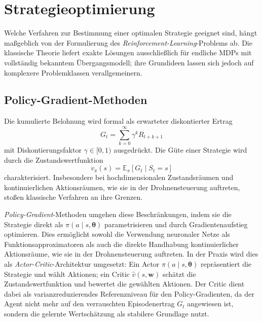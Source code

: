 \section{Strategieoptimierung}
\label{sec:ppo}

Welche Verfahren zur Bestimmung einer optimalen Strategie geeignet sind, hängt maßgeblich von der Formulierung des \textit{Reinforcement-Learning}-Problems ab. Die klassische Theorie liefert exakte Lösungen ausschließlich für endliche MDPs mit vollständig bekanntem Übergangsmodell; ihre Grundideen lassen sich jedoch auf komplexere Problemklassen verallgemeinern.

\subsection{Policy-Gradient-Methoden}
\label{subsec:policy_gradient}

Die kumulierte Belohnung wird formal als erwarteter
diskontierter Ertrag
\begin{equation} \label{eq:return}
    G_t = \sum_{k=0}^{\infty} \gamma^k R_{t+k+1}
\end{equation}
mit Diskontierungsfaktor $\gamma \in [0,1)$ ausgedrückt. Die
Güte einer Strategie wird durch die
Zustandswertfunktion
\begin{equation} \label{eq:state_value}
    v_\pi(s) = \mathbb{E}_\pi[G_t \mid S_t = s]
\end{equation}
charakterisiert. Insbesondere bei hochdimensionalen
Zustandsräumen und kontinuierlichen Aktionsräumen, wie sie in
der Drohnensteuerung auftreten, stoßen klassische Verfahren an
ihre Grenzen.

\textit{Policy-Gradient}-Methoden umgehen diese Beschränkungen, indem
sie die Strategie direkt als $\pi(a \mid s,
\boldsymbol{\theta})$ parametrisieren und durch
Gradientenaufstieg optimieren. Dies ermöglicht sowohl die
Verwendung neuronaler Netze als Funktionsapproximatoren als
auch die direkte Handhabung kontinuierlicher Aktionsräume, wie
sie in der Drohnensteuerung auftreten. In der Praxis wird dies
als \textit{Actor-Critic}-Architektur umgesetzt: Ein
Actor $\pi(a \mid s, \boldsymbol{\theta})$
repräsentiert die Strategie und wählt Aktionen; ein
Critic $\hat{v}(s, \mathbf{w})$ schätzt die
Zustandswertfunktion und bewertet die gewählten Aktionen. Der
Critic dient dabei als varianzreduzierendes Referenzniveau
für den Policy-Gradienten, da der Agent nicht mehr auf den
verrauschten Episodenertrag $G_t$ angewiesen ist, sondern die
gelernte Wertschätzung als stabilere Grundlage nutzt.

